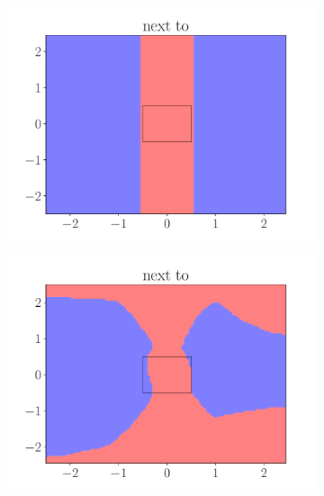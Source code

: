 \begin{figure}[ht]
    \centering
        \begin{subfigure}{0.45\textwidth}
            \centering
            \includegraphics[width=\textwidth]{figures/next_to_rule.pdf}
        \end{subfigure}
        \begin{subfigure}{0.45\textwidth}
            \centering
            \includegraphics[width=\textwidth]{figures/next_to_predicate_only.pdf}
        \end{subfigure}
        \begin{subfigure}{0.45\textwidth}
            \centering

\end{subfigure}
\end{figure}
